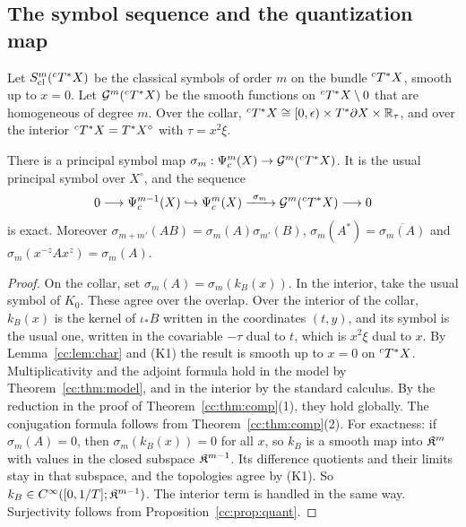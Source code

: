 \subsection{The symbol sequence and the quantization map}
\label{cc:subsec:symbol}
Let \(S_{\mathrm{cl}}^m({}^cT^*X)\) be the classical symbols of order \(m\) on the
bundle \({}^cT^*X\), smooth up to \(x=0\). Let \(\mathcal G^m({}^cT^*X)\) be the
smooth functions on \({}^cT^*X\setminus0\) that are homogeneous of degree
\(m\). Over the collar,
\({}^cT^*X\cong[0,\epsilon)\times T^*\partial X\times\mathbb R_\tau\), and over the
interior \({}^cT^*X=T^*X^\circ\) with \(\tau=x^2\xi\).

\begin{proposition}
\label{cc:prop:symbol}
There is a principal symbol map \(\sigma_m:\Psi_{c}^m(X)\to\mathcal
G^m({}^cT^*X)\). It is the usual principal symbol over \(X^\circ\), and the
sequence
\[
 0\longrightarrow\Psi_{c}^{m-1}(X)\hookrightarrow\Psi_{c}^m(X)
 \xrightarrow{\ \sigma_m\ }\mathcal G^m({}^cT^*X)\longrightarrow0
\]
is exact. Moreover
\(\sigma_{m+m'}(AB)=\sigma_m(A)\sigma_{m'}(B)\),
\(\sigma_m(A^*)=\overline{\sigma_m(A)}\) and
\(\sigma_m(x^{-z}Ax^z)=\sigma_m(A)\).
\end{proposition}

\begin{proof}
On the collar, set \(\sigma_m(A)=\sigma_m(k_B(x))\). In the interior,
take the usual symbol of \(K_0\). These agree over the overlap. Over the
interior of the collar, \(k_B(x)\) is the kernel of \(\iota_*B\) written
in the coordinates \((t,y)\), and its symbol is the usual one, written in
the covariable \(-\tau\) dual to \(t\), which is \(x^2\xi\) dual to
\(x\). By Lemma~\ref{cc:lem:char} and (K1) the result is smooth up to
\(x=0\) on \({}^cT^*X\). Multiplicativity and the adjoint formula hold in the
model by Theorem~\ref{cc:thm:model}, and in the interior by the standard
calculus. By the reduction in the proof of Theorem~\ref{cc:thm:comp}(1),
they hold globally. The conjugation formula follows from
Theorem~\ref{cc:thm:comp}(2). For exactness: if \(\sigma_m(A)=0\), then
\(\sigma_m(k_B(x))=0\) for all \(x\), so \(k_B\) is a smooth map into
\(\mathfrak K^m\) with values in the closed subspace \(\mathfrak K^{m-1}\). Its
difference quotients and their limits stay in that subspace, and the
topologies agree by (K1). So \(k_B\in C^\infty([0,1/T];\mathfrak K^{m-1})\). The
interior term is handled in the same way. Surjectivity follows from Proposition~\ref{cc:prop:quant}.
\end{proof}


